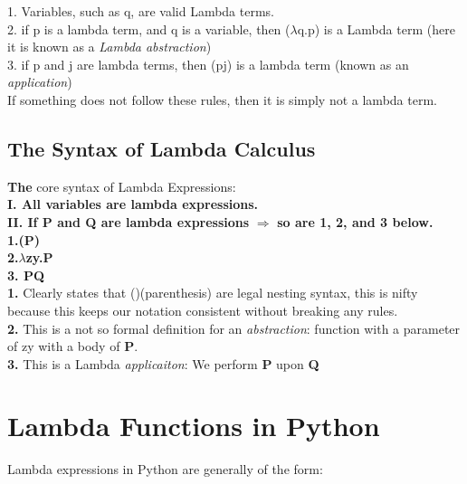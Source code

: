 \documentclass[oneside,12pt]{memoir} %
\begin{document}
1. Variables, such as q, are valid Lambda terms. \\
2. if p is a lambda term, and q is a variable, then (\ensuremath{\lambda}q.p) is a Lambda term (here it is known as a \emph{Lambda abstraction})\\
3. if p and j are lambda terms, then (pj) is a lambda term (known as an \emph{application})\\

If something does not follow these rules, then it is simply not a lambda term. 

\subsection{\textbf{The Syntax of Lambda Calculus}}
\label{sub:the_syntax_of_lambda_calculus}





\textbf{The} core syntax of Lambda Expressions:\\

\textbf{I. All variables are lambda expressions.}\\
\textbf{II. If P and Q are lambda expressions}
 \ensuremath{\Rightarrow}
\textbf{so are 1, 2, and 3 below.}\\
\textbf{1.(P)}\\
\textbf{2.\ensuremath{\lambda}zy.P}\\
\textbf{3. PQ}\\


\textbf{1.} Clearly states that ()(parenthesis) are legal nesting syntax, this is nifty because this keeps our notation consistent without breaking any rules.\\
\textbf{2.} This is a not so formal definition for an \emph{abstraction}: function with a parameter of zy with a body of \textbf{P}.\\
\textbf{3.} This is a Lambda \emph{applicaiton}: We perform \textbf{P} upon \textbf{Q}\\

\section{\textbf{Lambda Functions in Python}}
\label{lambda_functions_in_python}


Lambda expressions in Python are generally of the form:\\
\end{document}
